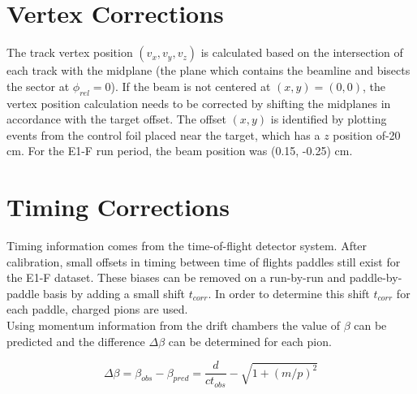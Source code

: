 
\section{Vertex Corrections}
The track vertex position $(v_x, v_y, v_z)$ is calculated based on the intersection of each track with the midplane (the plane which contains the beamline and bisects the sector at $\phi_{rel} = 0$).  If the beam is not centered at $(x,y)=(0,0)$, the vertex position calculation needs to be corrected by shifting the midplanes in accordance with the target offset.  The offset $(x,y)$ is identified by plotting events from the control foil placed near the target, which has a $z$ position of-20 cm. For the E1-F run period, the beam position was (0.15, -0.25) cm.  \\


\section{Timing Corrections}
Timing information comes from the time-of-flight detector system.  After calibration, small offsets in timing between time of flights paddles still exist for the E1-F dataset.  These biases can be removed on a run-by-run and paddle-by-paddle basis by adding a small shift $t_{corr}$.  In order to determine this shift $t_{corr}$ for each paddle, charged pions are used.  \\

Using momentum information from the drift chambers the value of $\beta$ can be predicted and the difference $\Delta \beta$ can be determined for each pion. 

\begin{equation}
	\Delta \beta = \beta_{obs} - \beta_{pred} = \frac{d}{c t_{obs}} - \sqrt{1+(m/p)^2} 
\end{equation} 

